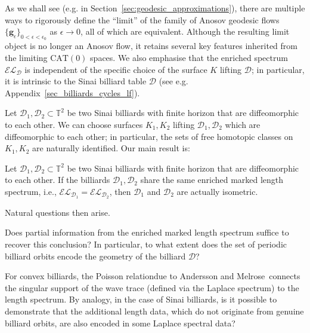 \documentclass[reqno,11pt]{amsart}
\begin{document}
\begin{remark}
As we shall see (e.g. in Section~\ref{sec:geodesic_approximations}), there are multiple ways to rigorously define the ``limit'' of the family of Anosov geodesic flows $\{\mathbf{g}_\epsilon\}_{0 < \epsilon < \epsilon_0}$ as $\epsilon \to 0$, all of which are equivalent. Although the resulting limit object is no longer an Anosov flow, it retains several key features inherited from the limiting $\mathrm{CAT(0)}$ spaces.
We also emphasise that the enriched spectrum $\mathcal{EL}_\mathcal{D}$ is independent of the specific choice of the surface $K$ lifting $\mathcal{D}$; in particular, it is intrinsic to the Sinai billiard table $\mathcal{D}$ (see e.g. Appendix~\ref{sec_billiards_cycles_lf}). 
\end{remark}
Let $\mathcal{D}_1,\mathcal{D}_2\subset \mathbb{T}^2$ be two Sinai billiards with finite horizon that are diffeomorphic to each other. We can choose surfaces $K_1,K_2$ lifting $\mathcal{D}_1,\mathcal{D}_2$ which are diffeomorphic to each other; in particular, the sets  of free homotopic classes on $K_1,K_2$ are naturally identified.  
Our main result is: 
\begin{theoalph} 
Let $\mathcal{D}_1,\mathcal{D}_2\subset \mathbb{T}^2$ be two Sinai billiards with finite horizon that are diffeomorphic to each other. If the billiards $\mathcal{D}_1,\mathcal{D}_2$ share the same enriched marked length spectrum, i.e., $\mathcal{EL}_{\mathcal{D}_1}=\mathcal{EL}_{\mathcal{D}_2}$, then $\mathcal{D}_1$ and $\mathcal{D}_2$ are actually isometric. 
\end{theoalph}
Natural questions then arise.
\begin{question}
Does partial information from the enriched marked length spectrum suffice to recover this conclusion? In particular, to what extent does the set of periodic billiard orbits encode the geometry of the billiard $\mathcal{D}$?
\end{question}

\begin{question}
For convex billiards, the Poisson relation\textemdash due to Andersson and Melrose~\cite{andersson1977propagation}\textemdash connects the singular support of the wave trace (defined via the Laplace spectrum) to the length spectrum. By analogy, in the case of Sinai billiards, is it possible to demonstrate that the additional length data, which do not originate from genuine billiard orbits, are also encoded in some Laplace spectral data?
\end{question}
\end{document}
